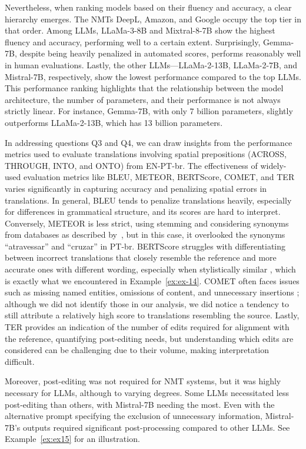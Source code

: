 Nevertheless, when ranking models based on their fluency and accuracy, a clear hierarchy emerges. The NMTs DeepL, Amazon, and Google occupy the top tier in that order. Among LLMs, LLaMa-3-8B and Mixtral-8-7B show the highest fluency and accuracy, performing well to a certain extent. Surprisingly, Gemma-7B, despite being heavily penalized in automated scores, performs reasonably well in human evaluations. Lastly, the other LLMs—LLaMa-2-13B, LLaMa-2-7B, and Mistral-7B, respectively, show the lowest performance compared to the top LLMs. This performance ranking highlights that the relationship between the model architecture, the number of parameters, and their performance is not always strictly linear. For instance, Gemma-7B, with only 7 billion parameters, slightly outperforms LLaMa-2-13B, which has 13 billion parameters.

In addressing questions Q3 and Q4, we can draw insights from the performance metrics used to evaluate translations involving spatial prepositions (ACROSS, THROUGH, INTO, and ONTO) from EN-PT-br. The effectiveness of widely-used evaluation metrics like BLEU, METEOR, BERTScore, COMET, and TER varies significantly in capturing accuracy and penalizing spatial errors in translations. In general, BLEU tends to penalize translations heavily, especially for differences in grammatical structure, and its scores are hard to interpret. Conversely, METEOR is less strict, using stemming and considering synonyms from databases as described by~\textcite{koehn2020neural}, but in this case, it overlooked the synonyms ``atravessar'' and ``cruzar'' in PT-br. BERTScore struggles with differentiating between incorrect translations that closely resemble the reference and more accurate ones with different wording, especially when stylistically similar \parencite{hanna-bojar-2021-fine}, which is exactly what we encountered in Example~\ref{ex:ex-14}. COMET often faces issues such as missing named entities, omissions of content, and unnecessary insertions \parencite{glushkova2023bleu}; although we did not identify those in our analysis, we did notice a tendency to still attribute a relatively high score to translations resembling the source. Lastly, TER provides an indication of the number of edits required for alignment with the reference, quantifying post-editing needs, but understanding which edits are considered can be challenging due to their volume, making interpretation difficult.

Moreover, post-editing was not required for NMT systems, but it was highly necessary for LLMs, although to varying degrees. Some LLMs necessitated less post-editing than others, with Mistral-7B needing the most. Even with the alternative prompt specifying the exclusion of unnecessary information, Mistral-7B's outputs required significant post-processing compared to other LLMs. See Example~\ref{ex:ex15} for an illustration.

